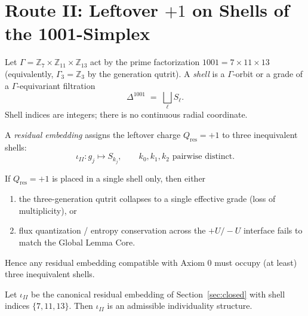 \section{Route II: Leftover \(+1\) on Shells of the 1001-Simplex}
\label{sec:route2}

\begin{definition}
\label{def:shells}
Let \(\Gamma=\mathbb{Z}_7\times\mathbb{Z}_{11}\times\mathbb{Z}_{13}\) act by the
prime factorization \(1001=7\times 11\times 13\) (equivalently,
\(\Gamma_3=\mathbb{Z}_3\) by the generation qutrit). A \emph{shell} is a
\(\Gamma\)-orbit or a grade of a \(\Gamma\)-equivariant filtration
\[
\Delta^{1001}\;=\;\bigsqcup_{\ell} S_\ell.
\]
Shell indices are integers; there is no continuous radial coordinate.
\end{definition}

\begin{definition}
\label{def:embed}
A \emph{residual embedding} assigns the leftover charge \(Q_{\mathrm{res}}=+1\)
to three inequivalent shells:
\begin{equation}
\label{eq:shells}
\iota_{II}\colon g_j \mapsto S_{k_j},\qquad
k_0,k_1,k_2\text{ pairwise distinct}.
\end{equation}
\end{definition}

\begin{lemma}
\label{lem:single-shell}
If \(Q_{\mathrm{res}}=+1\) is placed in a single shell only, then either
\begin{enumerate}[label=(\alph*)]
  \item the three-generation qutrit collapses to a single effective grade
        (loss of multiplicity), or
  \item flux quantization / entropy conservation across the \(+U/-U\) interface
        fails to match the Global Lemma Core.
\end{enumerate}
Hence any residual embedding compatible with Axiom 0 must occupy (at least)
three inequivalent shells.
\end{lemma}

\begin{theorem}
\label{thm:route2}
Let \(\iota_{II}\) be the canonical residual embedding of
Section~\ref{sec:closed} with shell indices \(\{7,11,13\}\). Then \(\iota_{II}\)
is an admissible individuality structure.
\end{theorem}

